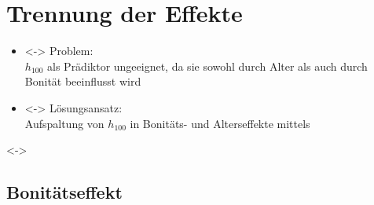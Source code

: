 \section{Trennung der Effekte}
\begin{frame}[c]

  \begin{itemize}
  \item<\theFirstElement-> Problem: \\
    \(h_{100}\) als Prädiktor ungeeignet, da sie sowohl durch Alter als auch durch Bonität beeinflusst wird
  \item<\theFirstElement-> Lösungsansatz: \\
    Aufspaltung von \(h_{100}\) in Bonitäts- und Alterseffekte mittels
  \end{itemize}

  \begin{center}
    \begin{minipage}{0.75\linewidth}
      \centerline{\visible<\theFirstElement->{\NagelFunctionSolvedForSI{}}}
      \vspace{\captiondistance}
    \end{minipage}
  \end{center}

\end{frame}

\subsection{Bonitätseffekt}

